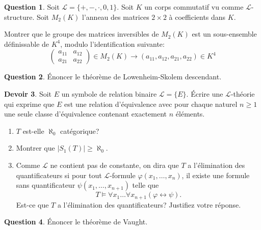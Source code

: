 \documentclass[12pt,a4paper]{exprog}
\theoremstyle{definition} \newtheorem{thm}{Th\'{e}or\`{e}me}
\theoremstyle{definition} \newtheorem{quest}{Question}
\theoremstyle{definition} \newtheorem{dev}[quest]{Devoir}
\begin{document}
\begin{quest}
  Soit $\mathcal L=\{+, -, \cdot, 0, 1\}$.
  Soit $K$ un corps commutatif vu comme $\mathcal L$-structure.
  Soit $M_2(K)$ l'anneau des matrices $2\times 2$ à coefficients
  dans $K$.

  Montrer que le groupe des matrices inversibles de $M_2(K)$
  est un sous-ensemble définissable de $K^4$, modulo
  l'identification suivante:
  \begin{equation*}
    \left( \begin{matrix}
        a_{1 1} & a_{1 2} \\
        a_{2 1} & a_{2 2}
      \end{matrix} \right)\in M_2(K)
    \rightarrow (a_{1 1}, a_{1 2}, a_{2 1}, a_{2 2}) \in K^4
  \end{equation*}
\end{quest}

\begin{quest}
  \'{E}noncer le théorème de Lowenheim-Skolem descendant.
\end{quest}

\begin{dev}
  Soit $E$ un symbole de relation binaire $\mathcal L= \{E\}$.
  \'{E}crire une $\mathcal L$-théorie qui exprime que $E$ est
  une relation d'équivalence avec pour chaque naturel $n\geq 1$
  une seule classe d'équivalence contenant exactement $n$ éléments.
  \begin{enumerate}
  \item $T$ est-elle $\aleph_0$ catégorique?
  \item Montrer que $|S_1(T)|\geq \aleph_0$.
  \item Comme $\mathcal L$ ne contient pas de constante,
    on dira que $T$ a l'élimination des quantificateurs
    si pour tout $\mathcal L$-formule $\varphi(x_1, \ldots, x_n)$,
    il existe une formule sans quantificateur
    $\psi(x_1, \ldots, x_{n+1})$ telle que
    $$T\models \forall x_1 \ldots \forall x_{n+1}
    (\varphi\leftrightarrow \psi).$$
    Est-ce que $T$ a l'élimination des quantificateurs? Justifiez
    votre réponse.
  \end{enumerate}
\end{dev}

\begin{quest}
  \'{E}noncer le théorème de Vaught.
\end{quest}
\end{document}
